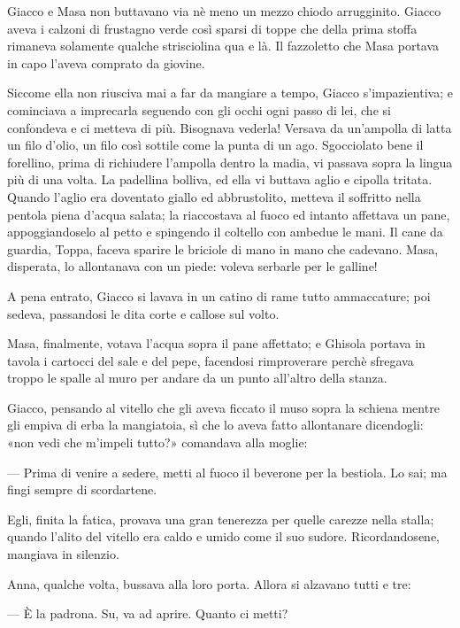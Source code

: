 Giacco e Masa non buttavano via nè meno un mezzo chiodo arrugginito. Giacco aveva i calzoni di frustagno verde così sparsi di toppe che della prima stoffa rimaneva solamente qualche strisciolina qua e là. Il fazzoletto che Masa portava in capo l’aveva comprato da giovine.

Siccome ella non riusciva mai a far da mangiare a tempo, Giacco s’impazientiva; e cominciava a imprecarla seguendo con gli occhi ogni passo di lei, che si confondeva e ci metteva di più. Bisognava vederla! Versava da un’ampolla di latta un filo d’olio, un filo così sottile come la punta di un ago. Sgocciolato bene il forellino, prima di richiudere l’ampolla dentro la madia, vi passava sopra la lingua più di una volta. La padellina bolliva, ed ella vi buttava aglio e cipolla tritata. Quando l’aglio era doventato giallo ed abbrustolito, metteva il soffritto nella pentola piena d’acqua salata; la riaccostava al fuoco ed intanto affettava un pane, appoggiandoselo al petto e spingendo il coltello con ambedue le mani. Il cane da guardia, Toppa, faceva sparire le briciole di mano in mano che cadevano. Masa, disperata, lo allontanava con un piede: voleva serbarle per le galline!

A pena entrato, Giacco si lavava in un catino di rame tutto ammaccature; poi sedeva, passandosi le dita corte e callose sul volto.

Masa, finalmente, votava l’acqua sopra il pane affettato; e Ghisola portava in tavola i cartocci del sale e del pepe, facendosi rimproverare perchè sfregava troppo le spalle al muro per andare da un punto all’altro della stanza.

Giacco, pensando al vitello che gli aveva ficcato il muso sopra la schiena mentre gli empiva di erba la mangiatoia, sì che lo aveva fatto allontanare dicendogli: «non vedi che m’impeli tutto?» comandava alla moglie:

— Prima di venire a sedere, metti al fuoco il beverone per la bestiola. Lo sai; ma fingi sempre di scordartene.

Egli, finita la fatica, provava una gran tenerezza per quelle carezze nella stalla; quando l’alito del vitello era caldo e umido come il suo sudore. Ricordandosene, mangiava in silenzio.

Anna, qualche volta, bussava alla loro porta. Allora si alzavano tutti e tre:

— È la padrona. Su, va ad aprire. Quanto ci metti?
